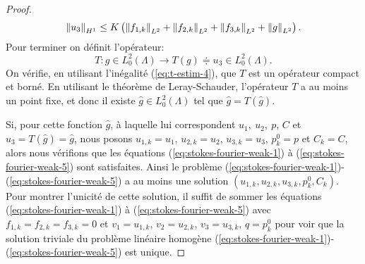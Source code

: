 \begin{proof}
\begin{equation}
    \norm{u_3}_{H^1} %
    \leq K\parent{\norm{f_{1,k}}_{L^2} %
      + \norm{f_{2,k}}_{L^2} %
      + \norm{f_{3,k}}_{L^2} %
      + \norm{g}_{L^2}}.
  \end{equation}
  Pour terminer on définit l'opérateur:
  \begin{equation}
    T: g\in L_0^2(\Lambda)\to T(g)\doteqdot u_3\in L_0^2(\Lambda).
  \end{equation}
  On vérifie, en utilisant l'inégalité (\ref{eq:t-estim-4}), que
  $T$ est un opérateur compact et borné. En utilisant le
  théorème de Leray-Schauder, l'opérateur $T$ a au moins un
  point fixe, et donc il existe $\hat g\in L_0^2(\Lambda)$ tel que
  $\hat g = T(\hat g)$.

  Si, pour cette fonction $\hat g$, à laquelle lui correspondent
  $u_1,\ u_2,\ p$, $C$ et $u_3 = T(\hat g) = \hat g$, nous posons
  $u_{1,k} = u_1$, $u_{2,k} = u_2$, $u_{3,k} = u_3$, $p_k^0 = p$ et
  $C_k = C$,
  alors nous vérifions que les équations
  (\ref{eq:stokes-fourier-weak-1}) à
  (\ref{eq:stokes-fourier-weak-5}) sont satisfaites. Ainsi le
  problème
  (\ref{eq:stokes-fourier-weak-1})-(\ref{eq:stokes-fourier-weak-5}) a
  au moins une solution $(u_{1,k},u_{2,k},u_{3,k},p_k^0,C_k)$.  Pour
  montrer l'unicité de cette solution, il suffit de sommer les
  équations (\ref{eq:stokes-fourier-weak-1}) à
  (\ref{eq:stokes-fourier-weak-5}) avec $f_{1,k} = f_{2,k} = f_{3,k} =
  0$ et $v_1 = u_{1,k}$, $v_2 = u_{2,k}$, $v_3 = u_{3,k}$, $q =
  p_{k}^0$ pour voir que la solution triviale du problème linéaire
  homogène
  (\ref{eq:stokes-fourier-weak-1})-(\ref{eq:stokes-fourier-weak-5})
  est unique.
\end{proof}

